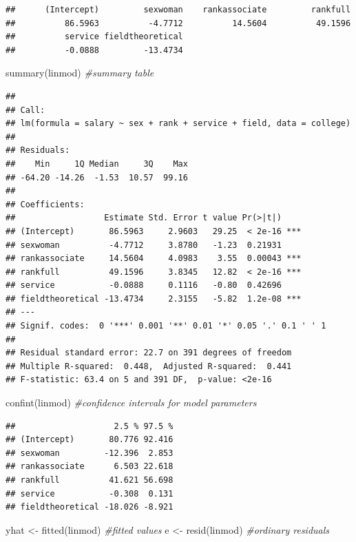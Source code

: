 \documentclass[
  11pt,
  letterpaper,
]{book}
\newenvironment{Shaded}{\begin{snugshade}}{\end{snugshade}}
\newcommand{\CommentTok}[1]{\textcolor[rgb]{0.56,0.35,0.01}{\textit{#1}}}
\newcommand{\FunctionTok}[1]{\textcolor[rgb]{0.00,0.00,0.00}{#1}}
\newcommand{\NormalTok}[1]{#1}
\newcommand{\OtherTok}[1]{\textcolor[rgb]{0.56,0.35,0.01}{#1}}
\theoremstyle{definition}
\theoremstyle{definition}
\theoremstyle{definition}
\theoremstyle{definition}
\theoremstyle{remark}
\begin{document}
\begin{verbatim}
##      (Intercept)         sexwoman    rankassociate         rankfull 
##          86.5963          -4.7712          14.5604          49.1596 
##          service fieldtheoretical 
##          -0.0888         -13.4734
\end{verbatim}

\begin{Shaded}
\begin{Highlighting}[]
\FunctionTok{summary}\NormalTok{(linmod) }\CommentTok{\#summary table}
\end{Highlighting}
\end{Shaded}

\begin{verbatim}
## 
## Call:
## lm(formula = salary ~ sex + rank + service + field, data = college)
## 
## Residuals:
##    Min     1Q Median     3Q    Max 
## -64.20 -14.26  -1.53  10.57  99.16 
## 
## Coefficients:
##                  Estimate Std. Error t value Pr(>|t|)    
## (Intercept)       86.5963     2.9603   29.25  < 2e-16 ***
## sexwoman          -4.7712     3.8780   -1.23  0.21931    
## rankassociate     14.5604     4.0983    3.55  0.00043 ***
## rankfull          49.1596     3.8345   12.82  < 2e-16 ***
## service           -0.0888     0.1116   -0.80  0.42696    
## fieldtheoretical -13.4734     2.3155   -5.82  1.2e-08 ***
## ---
## Signif. codes:  0 '***' 0.001 '**' 0.01 '*' 0.05 '.' 0.1 ' ' 1
## 
## Residual standard error: 22.7 on 391 degrees of freedom
## Multiple R-squared:  0.448,  Adjusted R-squared:  0.441 
## F-statistic: 63.4 on 5 and 391 DF,  p-value: <2e-16
\end{verbatim}

\begin{Shaded}
\begin{Highlighting}[]
\FunctionTok{confint}\NormalTok{(linmod) }\CommentTok{\#confidence intervals for model parameters}
\end{Highlighting}
\end{Shaded}

\begin{verbatim}
##                    2.5 % 97.5 %
## (Intercept)       80.776 92.416
## sexwoman         -12.396  2.853
## rankassociate      6.503 22.618
## rankfull          41.621 56.698
## service           -0.308  0.131
## fieldtheoretical -18.026 -8.921
\end{verbatim}

\begin{Shaded}
\begin{Highlighting}[]
\NormalTok{yhat }\OtherTok{\textless{}{-}} \FunctionTok{fitted}\NormalTok{(linmod) }\CommentTok{\#fitted values}
\NormalTok{e }\OtherTok{\textless{}{-}} \FunctionTok{resid}\NormalTok{(linmod) }\CommentTok{\#ordinary residuals}
\end{Highlighting}
\end{Shaded}


  
\end{document}
